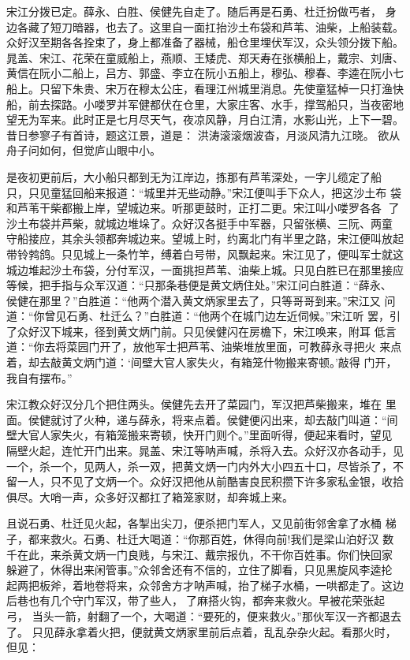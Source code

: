 宋江分拨已定。薛永、白胜、侯健先自走了。随后再是石勇、杜迁扮做丐者，
身边各藏了短刀暗器，也去了。这里自一面扛抬沙土布袋和芦苇、油柴，上船装载。
众好汉至期各各拴束了，身上都准备了器械，船仓里埋伏军汉，众头领分拨下船。
晁盖、宋江、花荣在童威船上，燕顺、王矮虎、郑天寿在张横船上，戴宗、刘唐、
黄信在阮小二船上，吕方、郭盛、李立在阮小五船上，穆弘、穆春、李逵在阮小七
船上。只留下朱贵、宋万在穆太公庄，看理江州城里消息。先使童猛棹一只打渔快
船，前去探路。小喽罗并军健都伏在仓里，大家庄客、水手，撑驾船只，当夜密地
望无为军来。此时正是七月尽天气，夜凉风静，月白江清，水影山光，上下一碧。
昔日参寥子有首诗，题这江景，道是：
洪涛滚滚烟波杳，月淡风清九江晓。
欲从舟子问如何，但觉庐山眼中小。

是夜初更前后，大小船只都到无为江岸边，拣那有芦苇深处，一字儿缆定了船
只，只见童猛回船来报道：“城里并无些动静。”宋江便叫手下众人，把这沙土布
袋和芦苇干柴都搬上岸，望城边来。听那更鼓时，正打二更。宋江叫小喽罗各各
了沙土布袋并芦柴，就城边堆垛了。众好汉各挺手中军器，只留张横、三阮、两童
守船接应，其余头领都奔城边来。望城上时，约离北门有半里之路，宋江便叫放起
带铃鹁鸽。只见城上一条竹竿，缚着白号带，风飘起来。宋江见了，便叫军士就这
城边堆起沙土布袋，分付军汉，一面挑担芦苇、油柴上城。只见白胜已在那里接应
等候，把手指与众军汉道：“只那条巷便是黄文炳住处。”宋江问白胜道：“薛永、
侯健在那里？”白胜道：“他两个潜入黄文炳家里去了，只等哥哥到来。”宋江又
问道：“你曾见石勇、杜迁么？”白胜道：“他两个在城门边左近伺候。”宋江听
罢，引了众好汉下城来，径到黄文炳门前。只见侯健闪在房檐下，宋江唤来，附耳
低言道：“你去将菜园门开了，放他军士把芦苇、油柴堆放里面，可教薛永寻把火
来点着，却去敲黄文炳门道：‘间壁大官人家失火，有箱笼什物搬来寄顿。’敲得
门开，我自有摆布。”

宋江教众好汉分几个把住两头。侯健先去开了菜园门，军汉把芦柴搬来，堆在
里面。侯健就讨了火种，递与薛永，将来点着。侯健便闪出来，却去敲门叫道：“间
壁大官人家失火，有箱笼搬来寄顿，快开门则个。”里面听得，便起来看时，望见
隔壁火起，连忙开门出来。晁盖、宋江等呐声喊，杀将入去。众好汉亦各动手，见
一个，杀一个，见两人，杀一双，把黄文炳一门内外大小四五十口，尽皆杀了，不
留一人，只不见了文炳一个。众好汉把他从前酷害良民积攒下许多家私金银，收拾
俱尽。大哨一声，众多好汉都扛了箱笼家财，却奔城上来。

且说石勇、杜迁见火起，各掣出尖刀，便杀把门军人，又见前街邻舍拿了水桶
梯子，都来救火。石勇、杜迁大喝道：“你那百姓，休得向前!我们是梁山泊好汉
数千在此，来杀黄文炳一门良贱，与宋江、戴宗报仇，不干你百姓事。你们快回家
躲避了，休得出来闲管事。”众邻舍还有不信的，立住了脚看，只见黑旋风李逵抡
起两把板斧，着地卷将来，众邻舍方才呐声喊，抬了梯子水桶，一哄都走了。这边
后巷也有几个守门军汉，带了些人，了麻搭火钩，都奔来救火。早被花荣张起弓，
当头一箭，射翻了一个，大喝道：“要死的，便来救火。”那伙军汉一齐都退去了。
只见薛永拿着火把，便就黄文炳家里前后点着，乱乱杂杂火起。看那火时，但见：

